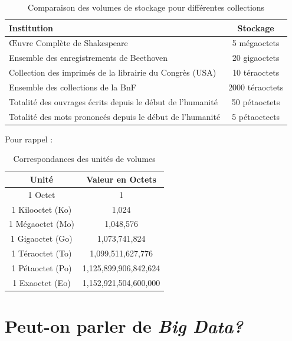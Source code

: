\renewcommand{\arraystretch}{1.5}

    \begin{table}[H]
    \centering
    \begin{tabular}{p{12cm}c}
        \toprule
        \textbf{Institution} & \textbf{Stockage} \\ %
        \midrule
        Œuvre Complète de Shakespeare & 5 mégaoctets \\
        Ensemble des enregistrements de Beethoven & 20 gigaoctets \\
        Collection des imprimés de la librairie du Congrès (USA) & 10 téraoctets \\
        Ensemble des collections de la BnF & 2000 téraoctets \\
        Totalité des ouvrages écrits depuis le début de l’humanité & 50 pétaoctets \\
        Totalité des mots prononcés depuis le début de l'humanité & 5 pétaoctects \\
        \bottomrule
    \end{tabular}
    \caption{Comparaison des volumes de stockage pour différentes collections}
    \label{tab:stockage}
\end{table}

Pour rappel :

\begin{table}[H]
    \centering
    \begin{tabular}{|c|c|}
        \hline
        \textbf{Unité} & \textbf{Valeur en Octets} \\
        \hline
        1 Octet & 1 \\
        1 Kilooctet (Ko) & 1{,}024 \\
        1 Mégaoctet (Mo) & 1{,}048{,}576 \\
        1 Gigaoctet (Go) & 1{,}073{,}741{,}824 \\
        1 Téraoctet (To) & 1{,}099{,}511{,}627{,}776 \\
        1 Pétaoctet (Po) & 1{,}125{,}899{,}906{,}842{,}624 \\
        1 Exaoctet (Eo) & 1{,}152{,}921{,}504{,}600{,}000 \\
        \hline
    \end{tabular}
    \caption{Correspondances des unités de volumes}
    \label{tab:volumes}
    \end{table}
    
    \section{Peut-on parler de \textit{Big Data?}}

